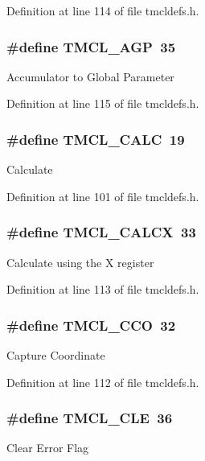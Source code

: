 Definition at line 114 of file tmcldefs.h.\hypertarget{group__TMCLComm_gae139fce6d594db73457f09527562468c}{
\subsubsection[{TMCL\_\-AGP}]{\setlength{\rightskip}{0pt plus 5cm}\#define TMCL\_\-AGP~35}}
\label{group__TMCLComm_gae139fce6d594db73457f09527562468c}
Accumulator to Global Parameter 

Definition at line 115 of file tmcldefs.h.\hypertarget{group__TMCLComm_gaaca5ca8ff4397dde2a1d974a08dfc97d}{
\subsubsection[{TMCL\_\-CALC}]{\setlength{\rightskip}{0pt plus 5cm}\#define TMCL\_\-CALC~19}}
\label{group__TMCLComm_gaaca5ca8ff4397dde2a1d974a08dfc97d}
Calculate 

Definition at line 101 of file tmcldefs.h.\hypertarget{group__TMCLComm_gad58eac496f0281febc26c7302e0f7236}{
\subsubsection[{TMCL\_\-CALCX}]{\setlength{\rightskip}{0pt plus 5cm}\#define TMCL\_\-CALCX~33}}
\label{group__TMCLComm_gad58eac496f0281febc26c7302e0f7236}
Calculate using the X register 

Definition at line 113 of file tmcldefs.h.\hypertarget{group__TMCLComm_ga55f02944bc20337ded009ae3a22a2e19}{
\subsubsection[{TMCL\_\-CCO}]{\setlength{\rightskip}{0pt plus 5cm}\#define TMCL\_\-CCO~32}}
\label{group__TMCLComm_ga55f02944bc20337ded009ae3a22a2e19}
Capture Coordinate 

Definition at line 112 of file tmcldefs.h.\hypertarget{group__TMCLComm_gadf8bf4f9343f77c0787ab0f131fbc92a}{
\subsubsection[{TMCL\_\-CLE}]{\setlength{\rightskip}{0pt plus 5cm}\#define TMCL\_\-CLE~36}}
\label{group__TMCLComm_gadf8bf4f9343f77c0787ab0f131fbc92a}
Clear Error Flag 

